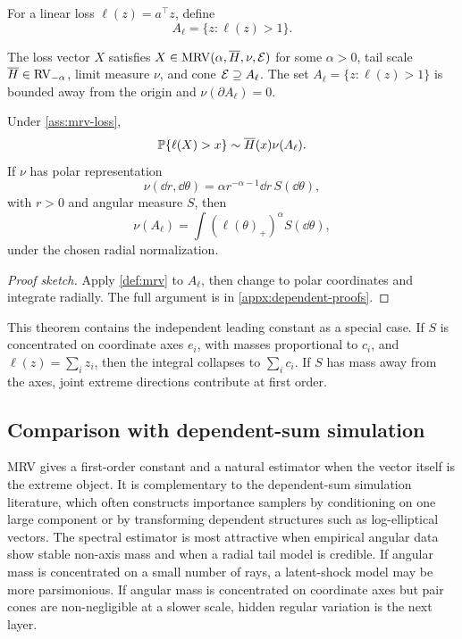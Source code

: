For a linear loss \(\ell(z)=a^\top z\), define
\[
  A_\ell=\{z:\ell(z)>1\}.
\]

\begin{assumption}
\label{ass:mrv-loss}
The loss vector $X$ satisfies $X\in\mathrm{MRV}(\alpha,\overline{H},\nu,\mathcal{E})$ for some
$\alpha>0$, tail scale $\overline{H}\in\mathrm{RV}_{-\alpha}$, limit measure $\nu$, and cone
$\mathcal{E}\supseteq A_\ell$. The set $A_\ell=\{z:\ell(z)>1\}$ is bounded away from
the origin and $\nu(\partial A_\ell)=0$.
\end{assumption}

\begin{theorem}
\label{thm:mrv-linear-risk}
Under \cref{ass:mrv-loss},
\[
  \mathbb{P}\{\ell(X)>x\}
  \sim \overline{H}(x)\nu(A_\ell).
\]
If \(\nu\) has polar representation
\[
  \nu(\dd r,\dd\theta)=\alpha r^{-\alpha-1}\dd r\,S(\dd\theta),
\]
with \(r>0\) and angular measure \(S\), then
\[
  \nu(A_\ell)=\int (\ell(\theta)_+)^\alpha S(\dd\theta),
\]
under the chosen radial normalization.
\end{theorem}

\begin{proof}[Proof sketch]
Apply \cref{def:mrv} to $A_\ell$, then change to polar coordinates and
integrate radially. The full argument is in \cref{appx:dependent-proofs}.
\end{proof}

This theorem contains the independent leading constant as a special case. If
\(S\) is concentrated on coordinate axes \(e_i\), with masses proportional to
\(c_i\), and \(\ell(z)=\sum_i z_i\), then the integral collapses to
\(\sum_i c_i\). If \(S\) has mass away from the axes, joint extreme directions
contribute at first order.



\subsection{Comparison with dependent-sum simulation}

MRV gives a first-order constant and a natural estimator when the vector itself
is the extreme object. It is complementary to the dependent-sum simulation
literature, which often constructs importance samplers by conditioning on one
large component or by transforming dependent structures such as log-elliptical
vectors. The spectral estimator is most attractive when empirical angular data
show stable non-axis mass and when a radial tail model is credible. If angular
mass is concentrated on a small number of rays, a latent-shock model may be more
parsimonious. If angular mass is concentrated on coordinate axes but pair cones
are non-negligible at a slower scale, hidden regular variation is the next
layer.


